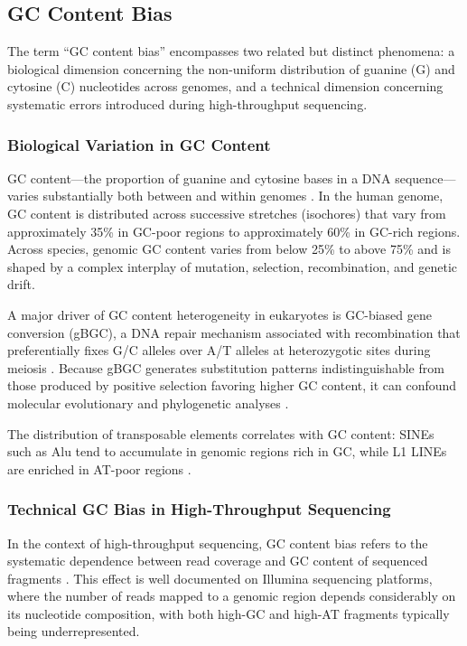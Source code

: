 \subsection{GC Content Bias}

The term ``GC content bias'' encompasses two related but distinct phenomena: a biological dimension concerning the non-uniform distribution of guanine (G) and cytosine (C) nucleotides across genomes, and a technical dimension concerning systematic errors introduced during high-throughput sequencing.

\subsubsection{Biological Variation in GC Content}

GC content---the proportion of guanine and cytosine bases in a DNA sequence---varies substantially both between and within genomes \parencite{benjamini2012}. In the human genome, GC content is distributed across successive stretches (isochores) that vary from approximately 35\% in GC-poor regions to approximately 60\% in GC-rich regions. Across species, genomic GC content varies from below 25\% to above 75\% and is shaped by a complex interplay of mutation, selection, recombination, and genetic drift.

A major driver of GC content heterogeneity in eukaryotes is GC-biased gene conversion (gBGC), a DNA repair mechanism associated with recombination that preferentially fixes G/C alleles over A/T alleles at heterozygotic sites during meiosis \parencite{galtier2001,eyre-walker1993,duret2009,lassalle2015}. Because gBGC generates substitution patterns indistinguishable from those produced by positive selection favoring higher GC content, it can confound molecular evolutionary and phylogenetic analyses \parencite{romiguier2010}.

The distribution of transposable elements correlates with GC content: SINEs such as Alu tend to accumulate in genomic regions rich in GC, while L1 LINEs are enriched in AT-poor regions \parencite{richard2008}.

\subsubsection{Technical GC Bias in High-Throughput Sequencing}

In the context of high-throughput sequencing, GC content bias refers to the systematic dependence between read coverage and GC content of sequenced fragments \parencite{dohm2008,chen2013,browne2020}. This effect is well documented on Illumina sequencing platforms, where the number of reads mapped to a genomic region depends considerably on its nucleotide composition, with both high-GC and high-AT fragments typically being underrepresented.

